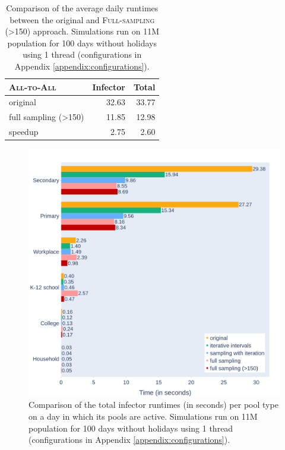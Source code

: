 \begin{table}
    \centering
    \begin{tabular}{@{}lrr@{}}
        \toprule
        \textsc{All-to-All} & Infector & Total \\ \midrule
        original & 32.63 & 33.77 \\
        full sampling (\textgreater{}150) & 11.85 & 12.98 \\ \hdashline[1pt/1pt]
        speedup & 2.75 & 2.60 \\ \bottomrule
    \end{tabular}
    \caption{Comparison of the average daily runtimes between the original and \textsc{Full-sampling (>150)} approach. Simulations run on 11M population for 100 days without holidays using 1 thread (configurations in Appendix \ref{appendix:configurations}).}
    \label{tab:fs_pSize_vs_standard_runtimes}
\end{table}

\begin{figure}
    \centering
    \includegraphics[width=\linewidth]{4 - Sampling/fig/adjusted_full_sampling/fs_pSize_vs_rest_type_totals.png}
    \caption{Comparison of the total infector runtimes (in seconds) per pool type on a day in which its pools are active. Simulations run on 11M population for 100 days without holidays using 1 thread (configurations in Appendix \ref{appendix:configurations}).}
    \label{fig:fs_pSize_vs_rest_type_totals}
\end{figure}


